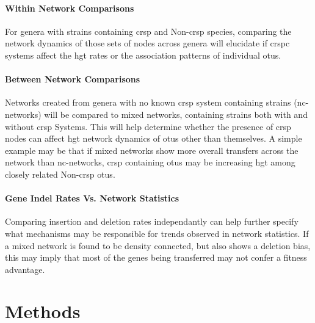 \documentclass[12pt,letter]{article}
\begin{document}
\paragraph*{Within Network Comparisons}%
For genera with strains containing \ac{crsp} and Non-\ac{crsp} species, comparing the network dynamics of those sets of nodes across genera will elucidate if \ac{crspc} systems affect the \ac{hgt} rates or the association patterns of individual \ac{otu}s.
\paragraph*{Between Network Comparisons}%
Networks created from genera with no known \ac{crsp} system containing strains (nc-networks) will be compared to mixed networks, containing strains both with and without \ac{crsp} Systems.
This will help determine whether the presence of \ac{crsp} nodes can affect \ac{hgt} network dynamics of \ac{otu}s other than themselves.
A simple example may be that if mixed networks show more overall transfers across the network than nc-networks, \ac{crsp} containing \ac{otu}s may be increasing \ac{hgt} among closely related Non-\ac{crsp} \ac{otu}s.
\paragraph*{Gene Indel Rates Vs. Network Statistics}%
Comparing insertion and  deletion rates independantly can help further specify what mechanisms may be responsible for trends observed in network statistics.
If a mixed network is found to be density connected, but also shows a deletion bias, this may imply that most of the genes being transferred may not confer a fitness advantage.
\section*{\huge Methods}
\end{document}

